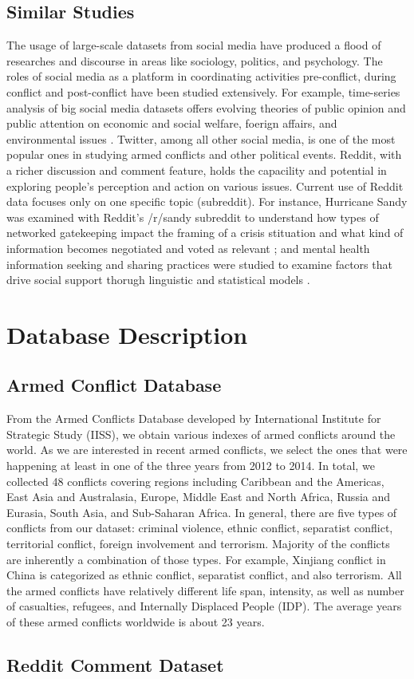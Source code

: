 \subsection{Similar Studies}
The usage of large-scale datasets from social media have produced a flood of researches and discourse in areas like sociology, politics, and psychology. The roles of social media as a platform in coordinating activities pre-conflict, during conflict and post-conflict have been studied extensively. For example, time-series analysis of big social media datasets offers evolving theories of public opinion and public attention on economic and social welfare, foerign affairs, and environmental issues \cite{RussellNeuman2014}. Twitter, among all other social media, is one of the most popular ones in studying armed conflicts and other political events. Reddit, with a richer discussion and comment feature, holds the capacility and potential in exploring people's perception and action on various issues. Current use of Reddit data focuses only on one specific topic (subreddit). For instance, Hurricane Sandy was examined with Reddit's /r/sandy subreddit to understand how types of networked gatekeeping impact the framing of a crisis stituation and what kind of information becomes negotiated and voted as relevant \cite{Leavitt}; and mental health information seeking and sharing practices were studied to examine factors that drive social support thorugh linguistic and statistical models \cite{dechoudhury2014mental}.


\section{Database Description}
\subsection{Armed Conflict Database}
From the Armed Conflicts Database developed by International Institute for Strategic Study (IISS), we obtain various indexes of armed conflicts around the world. As we are interested in recent armed conflicts, we select the ones that were happening at least in one of the three years from 2012 to 2014. In total, we collected 48 conflicts covering regions including Caribbean and the Americas, East Asia and Australasia, Europe, Middle East and North Africa, Russia and Eurasia, South Asia, and Sub-Saharan Africa. In general, there are five types of conflicts from our dataset: criminal violence, ethnic conflict, separatist conflict, territorial conflict, foreign involvement and terrorism. Majority of the conflicts are inherently a combination of those types. For example, Xinjiang conflict in China is categorized as ethnic conflict, separatist conflict, and also terrorism. All the armed conflicts have relatively different life span, intensity, as well as number of casualties, refugees, and Internally Displaced People (IDP). The average years of these armed conflicts worldwide is about 23 years.

\subsection{Reddit Comment Dataset}
